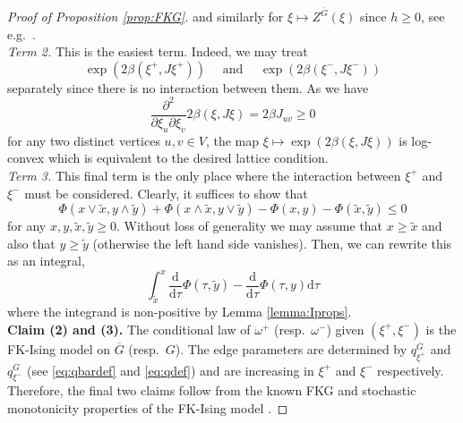 \documentclass{article}
\numberwithin{equation}{section}
\theoremstyle{definition}
\theoremstyle{definition}
\theoremstyle{remark}
\renewcommand{\d}{\mathrm{d}}
\renewcommand{\d}{\mathrm{d}}
\newcommand{\w}{\omega}
\newcommand{\I}{\Phi}
\renewcommand{\L}{\xi}
\begin{document}
\begin{proof}[Proof of Proposition \ref{prop:FKG}]
	and similarly for $\L \mapsto Z^{ \overline{G}}(\L)$ since $h \geq 0$, see e.g.~\cite[Lemma 6.1]{LamOtt}.
	\\[1em]
	\noindent\emph{Term 2. }This is the easiest term. Indeed, we may treat 
	\[
		\exp(2\beta(\L^+,J\L^+)) \quad \text{ and }\quad \exp(2\beta(\L^-,J\L^-))
	\] 
	separately since there is no interaction between them. As we have
	\[
		\frac{\partial^2 }{\partial \L_u \partial \L_v} 2\beta \left( \L, J \L \right)  = 2\beta J_{uv} \geq 0
	\] 
	for any two distinct vertices $u,v \in V$, the map $\L \mapsto \exp(2\beta(\L,J\L))$ is log-convex which is equivalent to the desired lattice condition.
	\\[1em]
	\noindent\emph{Term 3. }This final term is the only place where the interaction between $\L^+$ and $\L^-$ must be considered. Clearly, it suffices to show that
	\[
		\I(x \vee \widetilde{x},y \wedge \widetilde{y}) +  \I(x \wedge \widetilde{x},y \vee \widetilde{y}) - \I(x,y) - \I( \widetilde{x}, \widetilde{y}) \leq 0
	\] 
	for any $x,y, \widetilde{x}, \widetilde{y} \geq 0$. Without loss of generality we may assume that $x \geq \widetilde{x}$ and also that $y \geq \widetilde{y}$ (otherwise the left hand side vanishes). Then, we can rewrite this as an integral,
	\[
		\int_{ \widetilde{x}}^{ x}  \frac{\d }{\d \tau} \I(\tau, \widetilde{y} ) - \frac{\d}{\d \tau}\I(\tau, y) \d \tau
	\] 
	where the integrand is non-positive by Lemma \ref{lemma:Iprops}. 
	\\[1em]
	\noindent\textbf{Claim (2) and (3). }The conditional law of $\w^+$ (resp.~$\w^-$) given $(\L^+,\L^-)$ is the FK-Ising model on $\overline{G}$ (resp.~$G$). The edge parameters are determined by $q_{\L^+}^{ \overline{G}}$ and $q_{\L^-}^G$ (see \eqref{eq:qbardef} and \eqref{eq:qdef}) and are increasing in $\L^+$ and $\L^-$ respectively. 
	Therefore, the final two claims follow from the known FKG and stochastic monotonicity properties of the FK-Ising model \cite{Grimmett}.
\end{proof}
\end{document}
